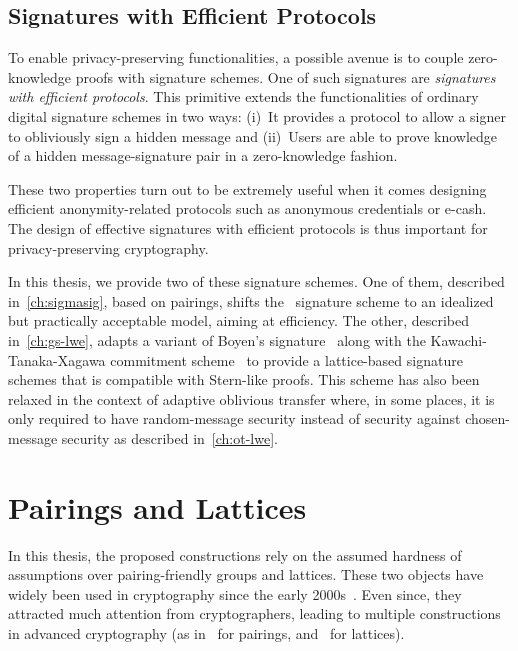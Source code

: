 \subsection{Signatures with Efficient Protocols}

To enable privacy-preserving functionalities, a possible avenue is to couple zero-knowledge proofs with signature schemes.
One of such signatures are \textit{signatures with efficient protocols}.
This primitive extends the functionalities of ordinary digital signature schemes in two ways: (i)~It provides a protocol to allow a signer to obliviously sign a hidden message and (ii)~Users are able to prove knowledge of a hidden message-signature pair in a zero-knowledge fashion.

These two properties turn out to be extremely useful when it comes designing efficient anonymity-related protocols such as anonymous credentials or e-cash.
The design of effective signatures with efficient protocols is thus important for privacy-preserving cryptography.

In this thesis, we provide two of these signature schemes.
One of them, described in~\cref{ch:sigmasig}, based on pairings, shifts the~\cite{LPY15} signature scheme to an idealized but practically acceptable model, aiming at efficiency.
The other, described in~\cref{ch:gs-lwe}, adapts a variant of Boyen's signature~\cite{Boy10,BHJ+15} along with the Kawachi-Tanaka-Xagawa commitment scheme~\cite{KTX08} to provide a lattice-based signature schemes that is compatible with Stern-like proofs.
This scheme has also been relaxed in the context of adaptive oblivious transfer where, in some places, it is only required to have random-message security instead of security against chosen-message security as described in~\cref{ch:ot-lwe}.

\section{Pairings and Lattices} 

In this thesis, the proposed constructions rely on the assumed hardness of assumptions over pairing-friendly groups and lattices.
These two objects have widely been used in cryptography since the early 2000s~\cite{SOK00,Reg05}.
Even since, they attracted much attention from cryptographers, leading to multiple constructions in advanced cryptography (as in~\cite{Jou00,BBS04,BN06,GS08,LYJP14,LPQ17} for pairings, and~\cite{GPV08,ABB10,BV11,GSW13,dPLNS17} for lattices).


